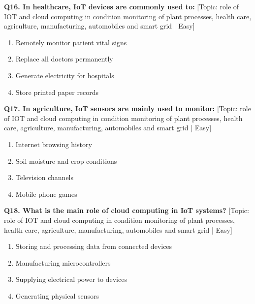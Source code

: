 \noindent\textbf{Q16. In healthcare, IoT devices are commonly used to:} \hfill [Topic: role of IOT and cloud computing in condition monitoring of plant processes, health care, agriculture, manufacturing, automobiles and smart grid | Easy]
\begin{enumerate}[label=(\alph*),topsep=2pt,itemsep=1pt,partopsep=0pt,parsep=0pt]
    \item {Remotely monitor patient vital signs}
    \item {Replace all doctors permanently}
    \item {Generate electricity for hospitals}
    \item {Store printed paper records}
\end{enumerate}
\vspace{2mm}

\noindent\textbf{Q17. In agriculture, IoT sensors are mainly used to monitor:} \hfill [Topic: role of IOT and cloud computing in condition monitoring of plant processes, health care, agriculture, manufacturing, automobiles and smart grid | Easy]
\begin{enumerate}[label=(\alph*),topsep=2pt,itemsep=1pt,partopsep=0pt,parsep=0pt]
    \item {Internet browsing history}
    \item {Soil moisture and crop conditions}
    \item {Television channels}
    \item {Mobile phone games}
\end{enumerate}
\vspace{2mm}

\noindent\textbf{Q18. What is the main role of cloud computing in IoT systems?} \hfill [Topic: role of IOT and cloud computing in condition monitoring of plant processes, health care, agriculture, manufacturing, automobiles and smart grid | Easy]
\begin{enumerate}[label=(\alph*),topsep=2pt,itemsep=1pt,partopsep=0pt,parsep=0pt]
    \item {Storing and processing data from connected devices}
    \item {Manufacturing microcontrollers}
    \item {Supplying electrical power to devices}
    \item {Generating physical sensors}
\end{enumerate}
\vspace{2mm}

